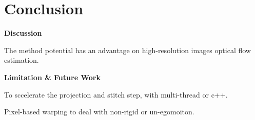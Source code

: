 \section{Conclusion}

\textbf{Discussion}

The method potential has an advantage on high-resolution images optical flow estimation.


\textbf{Limitation \& Future Work}

To sccelerate the projection and stitch step, with multi-thread or c++.

Pixel-based warping to deal with non-rigid or un-egomoiton.